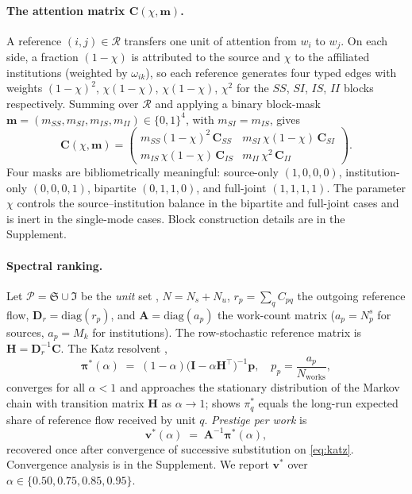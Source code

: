 \documentclass[10pt]{article}
\begin{document}
\paragraph{The attention matrix $\mathbf{C}(\chi,\mathbf{m})$.}

A reference $(i,j)\in\mathcal{R}$ transfers one unit of attention from
$w_i$ to $w_j$.
On each side, a fraction $(1-\chi)$ is attributed to the source and
$\chi$ to the affiliated institutions (weighted by $\omega_{ik}$), so
each reference generates four typed edges with weights
$(1-\chi)^2$, $\chi(1-\chi)$, $\chi(1-\chi)$, $\chi^2$ for the
$SS$, $SI$, $IS$, $II$ blocks respectively.
Summing over $\mathcal{R}$ and applying a binary block-mask
$\mathbf{m}=(m_{SS},m_{SI},m_{IS},m_{II})\in\{0,1\}^4$,
with $m_{SI}=m_{IS}$, gives
\begin{equation}
  \mathbf{C}(\chi,\mathbf{m}) =
  \begin{pmatrix}
    m_{SS}(1-\chi)^2\,\mathbf{C}_{SS} &
    m_{SI}\,\chi(1-\chi)\,\mathbf{C}_{SI} \\[4pt]
    m_{IS}\,\chi(1-\chi)\,\mathbf{C}_{IS} &
    m_{II}\,\chi^2\,\mathbf{C}_{II}
  \end{pmatrix}.
  \label{eq:C}
\end{equation}
Four masks are bibliometrically meaningful: source-only $(1,0,0,0)$,
institution-only $(0,0,0,1)$, bipartite $(0,1,1,0)$, and full-joint
$(1,1,1,1)$.
The parameter $\chi$ controls the source--institution balance in the
bipartite and full-joint cases and is inert in the single-mode cases.
Block construction details are in the Supplement.

\paragraph{Spectral ranking.}

Let $\mathcal{P}=\mathfrak{S}\cup\mathfrak{I}$ be the \emph{unit} set
\citep{pinskiNarin1976}, $N=N_s+N_u$, $r_p=\sum_q C_{pq}$ the
outgoing reference flow, $\mathbf{D}_r=\mathrm{diag}(r_p)$, and
$\mathbf{A}=\mathrm{diag}(a_p)$ the work-count matrix ($a_p=N^s_p$
for sources, $a_p=M_k$ for institutions).
The row-stochastic reference matrix is
$\mathbf{H}=\mathbf{D}_r^{-1}\mathbf{C}$.
The Katz resolvent \citep{katz1953,franceschetPagerank2010},
\begin{equation}
  \boldsymbol{\pi}^*(\alpha)
  \;=\;(1-\alpha)\bigl(\mathbf{I}-\alpha\mathbf{H}^\top\bigr)^{-1}\mathbf{p},
  \quad p_p=\frac{a_p}{N_\text{works}},
  \label{eq:katz}
\end{equation}
converges for all $\alpha<1$ and approaches the stationary distribution
of the Markov chain with transition matrix $\mathbf{H}$ as $\alpha\to
1$; \citet{geller1978} shows $\pi^*_q$ equals the long-run expected
share of reference flow received by unit $q$.
\emph{Prestige per work} \citep{palacioshuertaVolij2004} is
\begin{equation}
  \mathbf{v}^*(\alpha)\;=\;\mathbf{A}^{-1}\boldsymbol{\pi}^*(\alpha),
  \label{eq:vstar}
\end{equation}
recovered once after convergence of successive substitution on
\eqref{eq:katz}. Convergence analysis is in the Supplement.
We report $\mathbf{v}^*$ over $\alpha\in\{0.50,0.75,0.85,0.95\}$.
\end{document}
